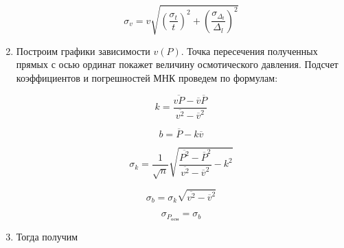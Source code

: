 \documentclass[a4paper, 12pt]{article}%
\begin{document}
\begin{enumerate}
	\begin{equation}
 \sigma_v = v \sqrt{(\frac{\sigma_t}{t})^2 + (\frac{\sigma_{\Delta_l}}{\Delta_l})^2 } 
\end{equation}

	
	\item Построим графики зависимости $ v(P) $. Точка пересечения полученных прямых с осью ординат покажет величину осмотического давления. Подсчет коэффициентов и погрешностей МНК проведем по формулам: 
	
\begin{equation}
	 k = \frac{\overline{vP} - \overline v  \overline P}{\overline{v^2} - \overline v ^2} 
\end{equation}
	
	\begin{equation}
		 b = \overline P - k \overline v 
	\end{equation}
	
	\begin{equation}
		 \sigma_k = \frac{1}{\sqrt n} \sqrt{\frac{\overline{P^2} - \overline P ^2}{\overline{v^2} - \overline v ^2} - k^2} 
	\end{equation}
	
	
	\begin{equation}
		 \sigma_b = \sigma_k \sqrt{\overline{v^2} - \overline v ^2} 
	\end{equation}
	
	\begin{equation} 
		\sigma_{P_{\text{осм}}} = \sigma_b
	\end{equation}
	
	\item Тогда получим 
	
	
	\begin{figure}[H]
	\end{figure}



\end{enumerate}
\end{document}
